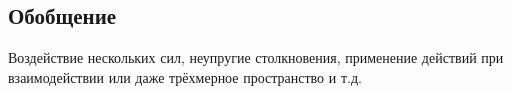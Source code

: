 \subsection{Обобщение \TODO}

\TODO Воздействие нескольких сил, неупругие столкновения,
применение действий при взаимодействии или даже трёхмерное пространство и т.д.


\TODO
